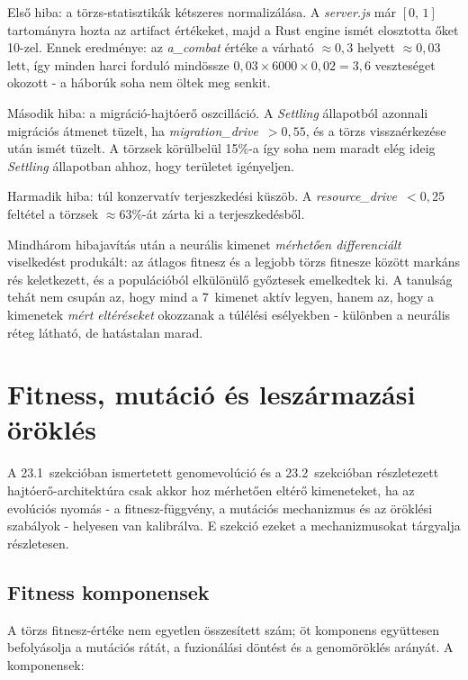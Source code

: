 Első hiba: a törzs-statisztikák kétszeres normalizálása.
A \textit{server.js} már \([0,\,1]\) tartományra hozta az artifact értékeket,
majd a Rust engine ismét elosztotta őket 10-zel.
Ennek eredménye: az \textit{a\_combat} értéke a várható $\approx0{,}3$ helyett
$\approx0{,}03$ lett, így minden harci forduló mindössze $0{,}03 \times 6000 \times 0{,}02 = 3{,}6$
veszteséget okozott - a háborúk soha nem öltek meg senkit.

Második hiba: a migráció-hajtóerő oszcilláció.
A \textit{Settling} állapotból azonnali migrációs átmenet tüzelt, ha
\textit{migration\_drive}~$> 0{,}55$, és a törzs visszaérkezése után
ismét tüzelt. A törzsek körülbelül 15\%-a így soha nem maradt elég ideig
\textit{Settling} állapotban ahhoz, hogy területet igényeljen.

Harmadik hiba: túl konzervatív terjeszkedési küszöb.
A \textit{resource\_drive}~$< 0{,}25$ feltétel a törzsek $\approx63$\%-át zárta
ki a terjeszkedésből.

Mindhárom hibajavítás után a neurális kimenet \textit{mérhetően differenciált}
viselkedést produkált: az átlagos fitnesz és a legjobb törzs fitnesze között
markáns rés keletkezett, és a populációból elkülönülő győztesek emelkedtek ki.
A tanulság tehát nem csupán az, hogy mind a 7~kimenet aktív legyen,
hanem az, hogy a kimenetek \textit{mért eltéréseket} okozzanak a túlélési
esélyekben - különben a neurális réteg látható, de hatástalan marad.

\section{Fitness, mutáció és leszármazási öröklés}
\label{sec:neurosim-25-fitness}

A 23.1~szekcióban ismertetett genomevolúció és a 23.2~szekcióban részletezett
hajtóerő-architektúra csak akkor hoz mérhetően eltérő kimeneteket, ha az evolúciós
nyomás - a fitnesz-függvény, a mutációs mechanizmus és az öröklési szabályok -
helyesen van kalibrálva. E szekció ezeket a mechanizmusokat tárgyalja részletesen.

\subsection*{Fitness komponensek}

A törzs fitnesz-értéke nem egyetlen összesített szám; öt komponens együttesen
befolyásolja a mutációs rátát, a fuzionálási döntést és a genomöröklés arányát.
A komponensek:

